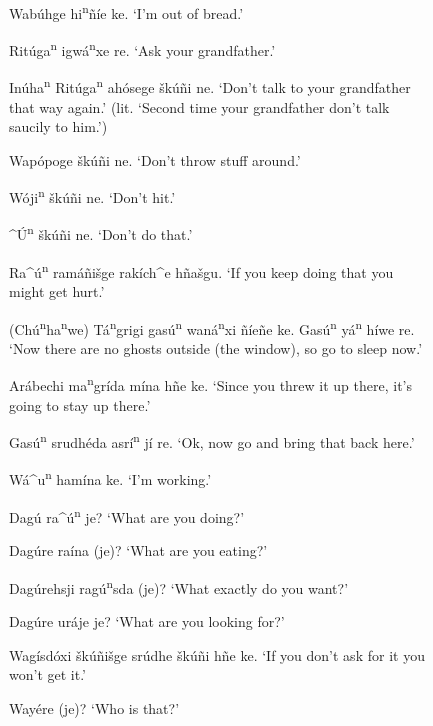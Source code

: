 \documentclass[output=paper]{LSP/langsci}
\begin{document}
\begin{figure}[p]
\begin{list}{}{} \itemsep1pt \parskip0pt 
\item{Wab\'uhge hi\textsuperscript{n}\~n\'ie ke. `I'm out of bread.'}
\item{Rit\'uga\textsuperscript{n} igw\'a\textsuperscript{n}xe re. `Ask your grandfather.'}
\item{In\'uha\textsuperscript{n} Rit\'uga\textsuperscript{n} ah\'osege šk\'u\~ni ne. `Don't talk to your grandfather that way again.' (lit. `Second time your grandfather don't talk saucily to him.')}
\item{Wap\'opoge \v{s}k\'u\~ni ne. `Don't throw stuff around.'}
\item{W\'oji\textsuperscript{n} \v{s}k\'u\~ni ne. `Don't hit.'}
\item{\^{ }\'U\textsuperscript{n} \v{s}k\'u\~ni ne. `Don't do that.'}
\item{}
\item{Ra\^{ }\'u\textsuperscript{n} ram\'a\~ni\v{s}ge rak\'ich\^{ }e h\~na\v{s}gu. `If you keep doing that you might get hurt.'}
\item{(Ch\'u\textsuperscript{n}ha\textsuperscript{n}we) T\'a\textsuperscript{n}grigi gas\'u\textsuperscript{n} wan\'a\textsuperscript{n}xi \~n\'ie\~ne ke. Gas\'u\textsuperscript{n} y\'a\textsuperscript{n} h\'iwe re. `Now there are no ghosts outside (the window), so go to sleep now.'}
\item{Ar\'abechi ma\textsuperscript{n}gr\'ida m\'ina h\~ne ke. `Since you threw it up there, it's going to stay up there.'}
\item{Gas\'u\textsuperscript{n} srudh\'eda asr\'i\textsuperscript{n} j\'i re. `Ok, now go and bring that back here.'}
\item{}
\item{W\'a\^{ }u\textsuperscript{n} ham\'ina ke.	`I'm working.'}
\item{Dag\'u ra\^{ }\'u\textsuperscript{n} je? `What are you doing?'}
\item{Dag\'ure ra\'ina (je)? `What are you eating?'}
\item{Dag\'urehsji rag\'u\textsuperscript{n}sda (je)? `What exactly do you want?'}
\item{Dag\'ure ur\'aje je? `What are you looking for?'}
\item{Wag\'isd\'oxi \v{s}k\'u\~ni\v{s}ge sr\'udhe \v{s}k\'u\~ni h\~ne ke. `If you don't ask for it you won't get it.'}
\item{Way\'ere (je)? `Who is that?'}

\end{list}
\end{figure}
\end{document}
